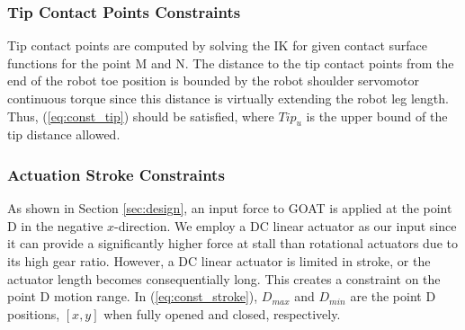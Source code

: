 \documentclass[letterpaper, 10 pt, conference]{ieeeconf}  %
\newcommand{\fig}[1]{Fig.~\ref{#1}}
\newcommand{\eq}[1]{(\ref{#1})}
\begin{document}

\subsubsection{Tip Contact Points Constraints}
Tip contact points are computed by solving the IK for given contact surface functions for the point M and N. The distance to the tip contact points from the end of the robot toe position is bounded by the robot shoulder servomotor continuous torque since this distance is virtually extending the robot leg length. Thus, \eq{eq:const_tip} should be satisfied, where $Tip_{u}$ is the upper bound of the tip distance allowed.%

\subsubsection{Actuation Stroke Constraints}
As shown in Section \ref{sec:design}, an input force to GOAT is applied at the point D in the negative $x$-direction. We employ a DC linear actuator as our input since it can provide a significantly higher force at stall than rotational actuators due to its high gear ratio. However, a DC linear actuator is limited in stroke, or the actuator length becomes consequentially long. 
This creates a constraint on the point D motion range. In \eq{eq:const_stroke}, $D_{max}$ and $D_{min}$ are the point D positions, $[x,y]$ when fully opened and closed, respectively.
\end{document}
